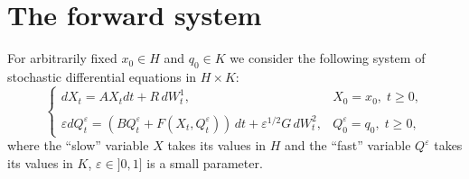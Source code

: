 \documentclass[reqno,a4paper,11 pt]{article}
\def \e {\varepsilon}
\numberwithin{equation}{section}
\begin{document}
\section{The forward system}
For arbitrarily fixed $x_0 \in H$ and $q_0 \in K$ we consider
 the following  system of  stochastic differential
equations in $H \times K$:
\begin{equation}
\label{eqX}
\begin{cases}
dX_t= AX_t dt +  R\, dW^1_t, & X_0=x_0,\; t\geq 0, \\ \\
 \e dQ^\e_t= (BQ^\e_t+ F(X_t,Q^\e_t) )\,dt + \e^{1/2} G \, dW^2_t, & Q^\e_0=q_0,\; t\geq 0,
\end{cases}
\end{equation}
 where the ``slow'' variable $X$ takes its values
in $H$ and the ``fast'' variable $Q^\e$ takes its values in $K$,
$\e \in ]0,1]$ is a small parameter. 
\end{document}
